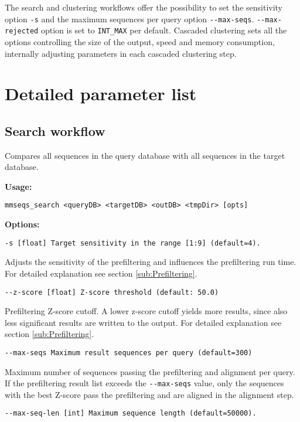 \documentclass[11pt,a4paper]{report}
\begin{document}
The search and clustering workflows offer the possibility to set the
sensitivity option \texttt{-s} and the maximum sequences per query
option \texttt{-{}-max-seqs}. \texttt{-{}-max-rejected} option is
set to \texttt{INT\_MAX} per default. Cascaded clustering sets all
the options controlling the size of the output, speed and memory consumption,
internally adjusting parameters in each cascaded clustering step.


\section{Detailed parameter list\label{sec:Detailed-parameter-list}}


\subsection{Search workflow\label{sub:Search-workflow}}

Compares all sequences in the query database with all sequences in
the target database. 

\textbf{Usage:}

\texttt{mmseqs\_search <queryDB> <targetDB> <outDB> <tmpDir> {[}opts{]}}

\textbf{Options:}

\texttt{\small -s {[}float{]} Target sensitivity in the range {[}1:9{]}
(default=4).}{\small \par}

Adjusts the sensitivity of the prefiltering and influences the prefiltering
run time. For detailed explanation see section \ref{sub:Prefiltering}.

\texttt{\small -{}-z-score {[}float{]} Z-score threshold (default: 50.0)}{\small \par}

Prefiltering Z-score cutoff. A lower z-score cutoff yields more results,
since also less significant results are written to the output. For
detailed explanation see section \ref{sub:Prefiltering}.

\texttt{\small -{}-max-seqs Maximum result sequences per query (default=300)}{\small \par}

Maximum number of sequences passing the prefiltering and alignment
per query. If the prefiltering result list exceeds the \texttt{-{}-max-seqs}
value, only the sequences with the best Z-score pass the prefiltering
and are aligned in the alignment step.

\texttt{\small -{}-max-seq-len {[}int{]} Maximum sequence length (default=50000).}{\small \par}
\end{document}
